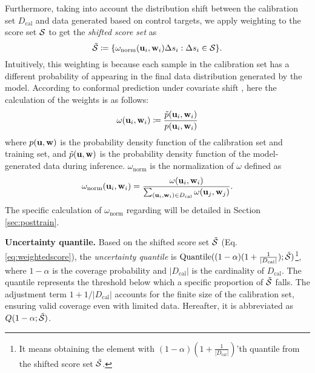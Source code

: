 Furthermore, taking into account the distribution shift between the calibration set $D_\text{cal}$ and data generated based on control targets, we apply weighting to the score set $\S$ to get the \textit{shifted score set} as
\begin{equation}
\scalebox{1}{$
    \Tilde{\S}\coloneqq\{\omega_{\textrm{norm}}(\u_i,\w_i)\Delta\score_i: \Delta\score_i\in \S\}.
    \label{eq:weightedscore}
$}
\end{equation}
Intuitively, this weighting is because each sample in the calibration set has a different probability of appearing in the final data distribution generated by the model. According to conformal prediction under covariate shift \cite{Tibshirani2019ConformalPU}, here the calculation of the weights is as follows:
\begin{equation}\omega(\u_i,\w_i)\coloneqq\frac{\Tilde{p}(\u_i,\w_i)}{p(\u_i,\w_i)}
\end{equation}
where $p(\u, \w)$ is the probability density function of the calibration set and training set, and $\Tilde{p}(\u, \w)$ is the probability density function of the model-generated data during inference. $\omega_\textrm{norm}$ is the normalization of $\omega$ defined as
\begin{equation}
    \omega_\textrm{norm}(\u_i,\w_i)=\frac{\omega(\u_i,\w_i)}{\sum_{(\u_i, \w_i)\in D_{\text{cal}}}{\omega(\u_j,\w_j)}}.
\end{equation}
The specific calculation of $\omega_\textrm{norm}$ regarding \proj will be detailed in Section \ref{sec:posttrain}.

\textbf{Uncertainty quantile.} Based on the shifted score set $\Tilde{\S}$ (Eq. \ref{eq:weightedscore}), the \textit{uncertainty quantile} is $\text{Quantile}((1-\alpha)(1+\frac{1}{|D_\text{cal}|});\Tilde{\S})$\footnote{It means obtaining the element with $(1-\alpha)(1+\frac{1}{|D_\text{cal}|})$'th quantile from the shifted score set $\Tilde{\S}$.}, where $1-\alpha$ is the coverage probability and $|D_\text{cal}|$ is the cardinality of $D_\text{cal}$. The quantile represents the threshold below which a specific proportion of $\Tilde{\S}$ falls. The adjustment term $1+1/|D_\text{cal}|$ accounts for the finite size of the calibration set, ensuring valid coverage even with limited data. Hereafter, it is abbreviated as $Q(1-\alpha;\Tilde{\S})$.

